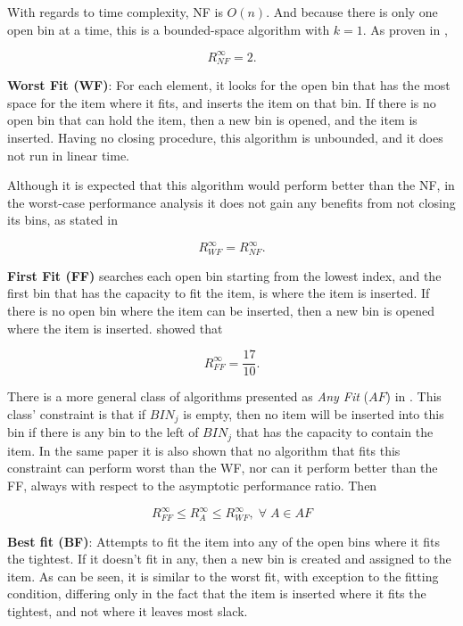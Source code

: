 With regards to time complexity, NF is $O(n)$. And because there is only one open bin at a time, this is a bounded-space algorithm with $k = 1$. As proven in \cite{johnson1973near}, 

\begin{equation}
    R_{NF}^\infty = 2.
\end{equation}

\textbf{Worst Fit (WF)}: For each element, it looks for the open bin that has the most space for the item where it fits, and inserts the item on that bin. If there is no open bin that can hold the item, then a new bin is opened, and the item is inserted. Having no closing procedure, this algorithm is unbounded, and it does not run in linear time.

Although it is expected that this algorithm would perform better than the NF, in the worst-case performance analysis it does not gain any benefits from not closing its bins, as stated in \cite{man1996approximation}

\begin{equation}
    R_{WF}^\infty = R_{NF}^\infty.
\end{equation}

\textbf{First Fit (FF)} searches each open bin starting from the lowest index, and the first bin that has the capacity to fit the item, is where the item is inserted. If there is no open bin where the item can be inserted, then a new bin is opened where the item is inserted. \cite{johnson1974worst} showed that 

\begin{equation}
    R_{FF}^\infty = \frac{17}{10}.
\end{equation}

There is a more general class of algorithms presented as \textit{Any Fit} ($AF$) in \cite{johnson1974fast}. This class' constraint is that if $BIN_j$ is empty, then no item will be inserted into this bin if there is any bin to the left of $BIN_j$ that has the capacity to contain the item. In the same paper it is also shown that no algorithm that fits this constraint can perform worst than the WF, nor can it perform better than the FF, always with respect to the asymptotic performance ratio. Then

\begin{equation}
    R_{FF}^\infty \leq R_A^\infty \leq R_{WF}^\infty, \; \forall \; A \in AF
\end{equation}

\textbf{Best fit (BF)}: Attempts to fit the item into any of the open bins where it fits the tightest. If it doesn't fit in any, then a new bin is created and assigned to the item. As can be seen, it is similar to the worst fit, with exception to the fitting condition, differing only in the fact that the item is inserted where it fits the tightest, and not where it leaves most slack.

